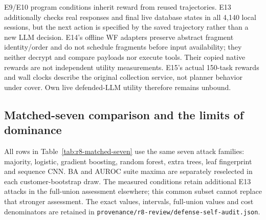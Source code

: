 E9/E10 program conditions inherit reward from reused trajectories. E13 additionally checks real responses and final live database states in all 4,140 local sessions, but the next action is specified by the saved trajectory rather than a new LLM decision. E14's offline WF adapters preserve abstract fragment identity/order and do not schedule fragments before input availability; they neither decrypt and compare payloads nor execute tools. Their copied native rewards are not independent utility measurements. E15's actual 150-task rewards and wall clocks describe the original collection service, not planner behavior under cover. Own live defended-LLM utility therefore remains unbound.

\subsection{Matched-seven comparison and the limits of dominance}
All rows in Table~\ref{tab:r8-matched-seven} use the same seven attack families: majority, logistic, gradient boosting, random forest, extra trees, leaf fingerprint and sequence CNN. BA and AUROC suite maxima are separately reselected in each customer-bootstrap draw. The measured conditions retain additional E13 attacks in the full-union assessment elsewhere; this common subset cannot replace that stronger assessment. The exact values, intervals, full-union values and cost denominators are retained in \texttt{provenance/r8-review/defense-self-audit.json}.

